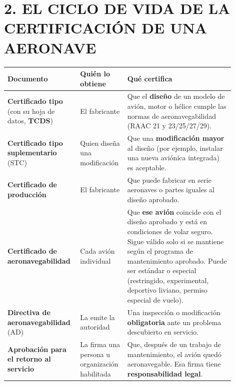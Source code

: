 \section*{2. EL CICLO DE VIDA DE LA CERTIFICACIÓN DE UNA AERONAVE}

\begin{center}
\end{center}

\begin{center}
\small
\begin{tabular}{|p{0.27\linewidth}|p{0.18\linewidth}|p{0.45\linewidth}|}
\hline
\textbf{Documento} & \textbf{Quién lo obtiene} & \textbf{Qué certifica} \\ \hline
\textbf{Certificado tipo} (con su hoja de datos, \textbf{TCDS}) & El fabricante & Que el
\textbf{diseño} de un modelo de avión, motor o hélice cumple las normas de aeronavegabilidad
(RAAC 21 y 23/25/27/29). \\ \hline
\textbf{Certificado tipo suplementario} (STC) & Quien diseña una modificación & Que una
\textbf{modificación mayor} al diseño (por ejemplo, instalar una nueva aviónica integrada) es
aceptable. \\ \hline
\textbf{Certificado de producción} & El fabricante & Que puede fabricar en serie aeronaves o
partes iguales al diseño aprobado. \\ \hline
\textbf{Certificado de aeronavegabilidad} & Cada avión individual & Que \textbf{ese avión}
coincide con el diseño aprobado y está en condiciones de volar seguro. Sigue válido solo si se
mantiene según el programa de mantenimiento aprobado. Puede ser estándar o especial (restringido,
experimental, deportivo liviano, permiso especial de vuelo). \\ \hline
\textbf{Directiva de aeronavegabilidad} (AD) & La emite la autoridad & Una inspección o
modificación \textbf{obligatoria} ante un problema descubierto en servicio. \\ \hline
\textbf{Aprobación para el retorno al servicio} & La firma una persona u organización habilitada
& Que, después de un trabajo de mantenimiento, el avión quedó aeronavegable. Esa firma tiene
\textbf{responsabilidad legal}. \\ \hline
\end{tabular}
\end{center}

